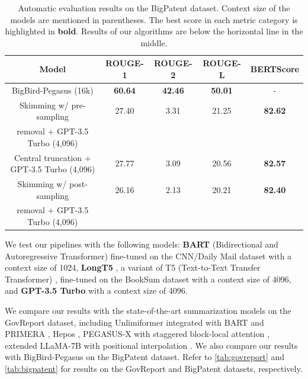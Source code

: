 \begin{table}[!ht]
  \centering

  \begin{tabular}{c c c c c}
    \hline
    Model & ROUGE-1 & ROUGE-2 & ROUGE-L & BERTScore \\
    \hline
    BigBird-Pegasus (16k) & \textbf{60.64} & \textbf{42.46} & \textbf{50.01} & - \\
    \hline
    Skimming w/ pre-sampling & 27.40 & 3.31 & 21.25 & \textbf{82.62} \\
    removal + GPT-3.5 Turbo (4,096) & & & & \\
    Central truncation + GPT-3.5 Turbo (4,096) & 27.77 & 3.09 & 20.56 & \textbf{82.57} \\
    Skimming w/ post-sampling & 26.16 & 2.13 & 20.21 & \textbf{82.40} \\
    removal + GPT-3.5 Turbo (4,096) & & & & \\
    \hline
  \end{tabular}

  \caption{
    Automatic evaluation results on the BigPatent dataset. Context size of the models are mentioned in parentheses.
    The best score in each metric category is highlighted in \textbf{bold}.
    Results of our algorithms are below the horizontal line in the middle.
  }
  \label{tab:bigpatent}
\end{table}

We test our pipelines with the following models: \textbf{BART} (Bidirectional and Autoregressive Transformer) \cite{lewis-etal-2020-bart} fine-tuned on the CNN/Daily Mail dataset \cite{nallapati2016abstractive} with a context size of 1024, \textbf{LongT5} \cite{guo2021longt5}, a variant of T5 (Text-to-Text Transfer Transformer) \cite{raffel2020exploring}, fine-tuned on the BookSum dataset with a context size of 4096, and \textbf{GPT-3.5 Turbo} \cite{brown2020language} with a context size of 4096.

We compare our results with the state-of-the-art summarization models on the GovReport dataset, including Unlimiformer \cite{bertsch2023unlimiformer} integrated with BART \cite{lewis-etal-2020-bart} and PRIMERA \cite{beltagy2020longformer}, Hepos \cite{huang-etal-2021-efficient}, PEGASUS-X with staggered block-local attention \cite{phang2022investigating}, extended	LLaMA-7B with positional interpolation \cite{chen2023extending}.
We also compare our results with BigBird-Pegasus \cite{zaheer2020big} on the BigPatent dataset.
Refer to \autoref{tab:govreport} and \autoref{tab:bigpatent} for results on the GovReport and BigPatent datasets, respectively.

